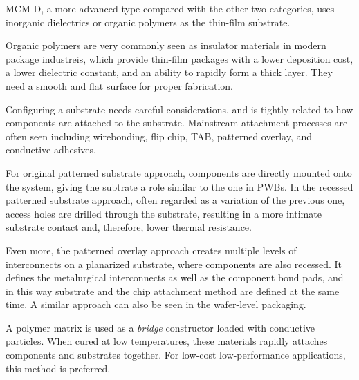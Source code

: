 \begin{spacing}{1.5}
MCM-D, a more advanced type compared with the other two categories, uses inorganic dielectrics or organic polymers as the thin-film substrate. \cite{chen2006vlsi} 

Organic polymers are very commonly seen as insulator materials in modern package industreis, which provide thin-film packages with a lower deposition cost, a lower dielectric constant, and an ability to rapidly form a thick layer. They need a smooth and flat surface for proper fabrication. 

Configuring a substrate needs careful considerations, and is tightly related to how components are attached to the substrate. Mainstream attachment processes are often seen including wirebonding, flip chip, TAB, patterned overlay, and conductive adhesives. 

For original patterned substrate approach, components are directly mounted onto the system, giving the subtrate a role similar to the one in PWBs. In the recessed patterned substrate approach, often regarded as a variation of the previous one, access holes are drilled through the substrate, resulting in a more intimate substrate contact and, therefore, lower thermal resistance. 

Even more, the patterned overlay approach creates multiple levels of interconnects on a planarized substrate, where components are also recessed. It defines the metalurgical interconnects as well as the component bond pads, and in this way substrate and the chip attachment method are defined at the same time. A similar approach can also be seen in the wafer-level packaging.  

A polymer matrix is used as a \textit{bridge} constructor loaded with conductive particles. When cured at low temperatures, these materials rapidly attaches components and substrates together. For low-cost low-performance applications, this method is preferred. \cite{bogatin1997roadmaps}

\end{spacing}
\newpage
